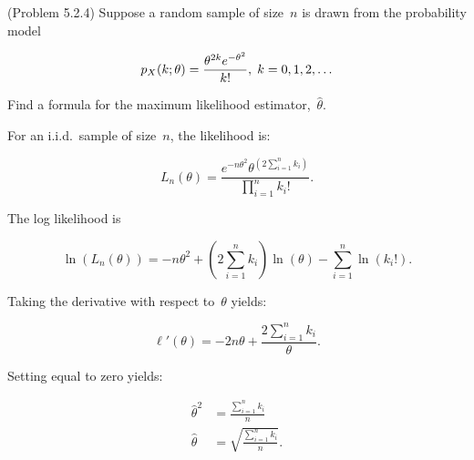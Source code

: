 \begin{problem}
  (\textnormal{Problem 5.2.4}) Suppose a random sample of size~$n$ is drawn from the probability model

  \begin{equation}\label{eq:P03:Distr}
    p_{X}(k;\theta) = \frac{\theta^{2k} e^{-\theta^2}}{k!}, \hspace{0.1cm}k=0,1,2,\ldots
  \end{equation}

  \noindent
  Find a formula for the maximum likelihood estimator,~$\hat{\theta}$.
\end{problem}

For an i.i.d.\ sample of size~$n$, the likelihood is:

\begin{equation}\label{eq:P03:Likelihood}
  L_{n}(\theta) = \frac{e^{-n\theta^{2}} \theta^{\left(2\sum_{i=1}^{n} k_i\right)}}{\prod_{i=1}^{n} k_i !}\text{.}
\end{equation}

\noindent
The log likelihood is

\begin{equation}\label{eq:P03:LogLikelihood}
  \ln\left(L_{n}(\theta)\right) = -n\theta^{2} + {\left(2\sum_{i=1}^{n} k_i\right)} \ln\left(\theta\right) - \sum_{i=1}^{n} \ln\left(k_{i}!\right) \text{.}
\end{equation}

\noindent
Taking the derivative with respect to~$\theta$ yields:

\begin{equation}\label{eq:P03:LogLikelihood:Deriv}
  \ell'(\theta) = -2n\theta + \frac{2\sum_{i=1}^{n} k_i}{\theta}\text{.}
\end{equation}

\noindent
Setting equal to zero yields:

\begin{align}
  \hat{\theta}^{2} &= \frac{\sum_{i=1}^{n} k_i}{n} \\
  \hat{\theta} &= \boxed{\sqrt{\frac{\sum_{i=1}^{n} k_i}{n}}} \text{.}
\end{align}
